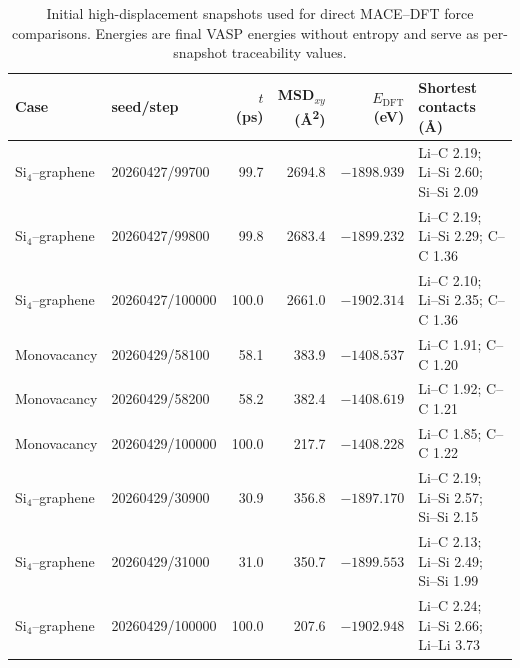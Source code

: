\begin{table}[!htbp]
  \centering
  \footnotesize
  \caption{Initial high-displacement snapshots used for direct MACE--DFT force
  comparisons. Energies are final VASP energies without entropy and serve as
  per-snapshot traceability values.}
  \label{tab:si_initial_snapshots}
  \begin{tabular}{llrrrp{3.4cm}}
    \toprule
    Case & seed/step & $t$ (ps) & MSD$_{xy}$ (\si{\angstrom\squared}) & $E_{\mathrm{DFT}}$ (eV) & Shortest contacts (\AA) \\
    \midrule
    Si$_4$--graphene & 20260427/99700 & 99.7 & 2694.8 & $-1898.939$ & Li--C 2.19; Li--Si 2.60; Si--Si 2.09 \\
    Si$_4$--graphene & 20260427/99800 & 99.8 & 2683.4 & $-1899.232$ & Li--C 2.19; Li--Si 2.29; C--C 1.36 \\
    Si$_4$--graphene & 20260427/100000 & 100.0 & 2661.0 & $-1902.314$ & Li--C 2.10; Li--Si 2.35; C--C 1.36 \\
    Monovacancy & 20260429/58100 & 58.1 & 383.9 & $-1408.537$ & Li--C 1.91; C--C 1.20 \\
    Monovacancy & 20260429/58200 & 58.2 & 382.4 & $-1408.619$ & Li--C 1.92; C--C 1.21 \\
    Monovacancy & 20260429/100000 & 100.0 & 217.7 & $-1408.228$ & Li--C 1.85; C--C 1.22 \\
    Si$_4$--graphene & 20260429/30900 & 30.9 & 356.8 & $-1897.170$ & Li--C 2.19; Li--Si 2.57; Si--Si 2.15 \\
    Si$_4$--graphene & 20260429/31000 & 31.0 & 350.7 & $-1899.553$ & Li--C 2.13; Li--Si 2.49; Si--Si 1.99 \\
    Si$_4$--graphene & 20260429/100000 & 100.0 & 207.6 & $-1902.948$ & Li--C 2.24; Li--Si 2.66; Li--Li 3.73 \\
    \bottomrule
  \end{tabular}
\end{table}
